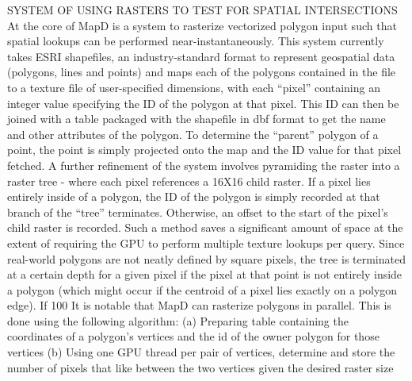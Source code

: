 \documentclass[twocolumn]{article}
\begin{document}
SYSTEM OF USING RASTERS TO TEST FOR SPATIAL INTERSECTIONS
At the core of MapD is a system to rasterize vectorized polygon input such that spatial lookups can be performed near-instantaneously. This system currently takes ESRI shapefiles, an industry-standard format to represent geospatial data (polygons, lines and points) and maps each of the polygons contained in the file to a texture file of user-specified dimensions, with each “pixel” containing an integer value specifying the ID of the polygon at that pixel. This ID can then be joined with a table packaged with the shapefile in dbf format to get the name and other attributes of the polygon. To determine the “parent” polygon of a point, the point is simply projected onto the map and the ID value for that pixel fetched. A further refinement of the system involves pyramiding the raster into a raster tree - where each pixel references a 16X16 child raster. If a pixel lies entirely inside of a polygon, the ID of the polygon is simply recorded at that branch of the “tree” terminates. Otherwise, an offset to the start of the pixel’s child raster is recorded. Such a method saves a significant amount of space at the extent of requiring the GPU to perform multiple texture lookups per query. Since real-world polygons are not neatly defined by square pixels, the tree is terminated at a certain depth for a given pixel if the pixel at
that point is not entirely inside a polygon (which might occur if the centroid of a pixel lies exactly on a polygon edge). If 100%
It is notable that MapD can rasterize polygons in parallel. This is done using the following algorithm:
(a) Preparing table containing the coordinates of a polygon’s vertices and the id of the owner polygon for those vertices
(b) Using one GPU thread per pair of vertices, determine and store the number of pixels that like between the two vertices given the desired raster size
\end{document}
